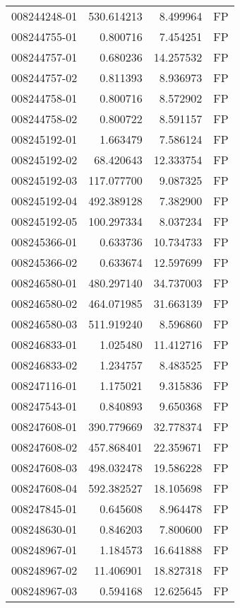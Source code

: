 \begin{tabular}{lrrl}
008244248-01 &  530.614213 &     8.499964 &   FP \\
008244755-01 &    0.800716 &     7.454251 &   FP \\
008244757-01 &    0.680236 &    14.257532 &   FP \\
008244757-02 &    0.811393 &     8.936973 &   FP \\
008244758-01 &    0.800716 &     8.572902 &   FP \\
008244758-02 &    0.800722 &     8.591157 &   FP \\
008245192-01 &    1.663479 &     7.586124 &   FP \\
008245192-02 &   68.420643 &    12.333754 &   FP \\
008245192-03 &  117.077700 &     9.087325 &   FP \\
008245192-04 &  492.389128 &     7.382900 &   FP \\
008245192-05 &  100.297334 &     8.037234 &   FP \\
008245366-01 &    0.633736 &    10.734733 &   FP \\
008245366-02 &    0.633674 &    12.597699 &   FP \\
008246580-01 &  480.297140 &    34.737003 &   FP \\
008246580-02 &  464.071985 &    31.663139 &   FP \\
008246580-03 &  511.919240 &     8.596860 &   FP \\
008246833-01 &    1.025480 &    11.412716 &   FP \\
008246833-02 &    1.234757 &     8.483525 &   FP \\
008247116-01 &    1.175021 &     9.315836 &   FP \\
008247543-01 &    0.840893 &     9.650368 &   FP \\
008247608-01 &  390.779669 &    32.778374 &   FP \\
008247608-02 &  457.868401 &    22.359671 &   FP \\
008247608-03 &  498.032478 &    19.586228 &   FP \\
008247608-04 &  592.382527 &    18.105698 &   FP \\
008247845-01 &    0.645608 &     8.964478 &   FP \\
008248630-01 &    0.846203 &     7.800600 &   FP \\
008248967-01 &    1.184573 &    16.641888 &   FP \\
008248967-02 &   11.406901 &    18.827318 &   FP \\
008248967-03 &    0.594168 &    12.625645 &   FP \\

\end{tabular}
